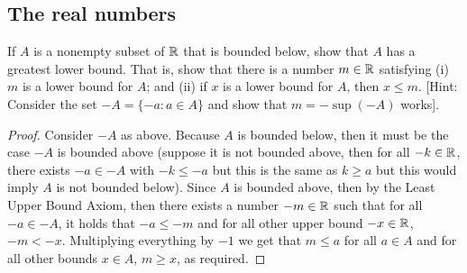 \subsection{The real numbers}

\begin{exercise}{1}
If $A$ is a nonempty subset of $\mathbb{R}$ that is bounded below, show that $A$ has a greatest lower bound. That is, show that there is a number $m\in\mathbb{R}$ satisfying (i) $m$ is a lower bound for $A$; and (ii) if $x$ is a lower bound for $A$, then $x\leq m$. [Hint: Consider the set $-A=\{-a:a\in A\}$ and show that $m=-\sup(-A)$ works].
\end{exercise}
\begin{proof}
Consider $-A$ as above. Because $A$ is bounded below, then it must be the case $-A$ is bounded above (suppose it is not bounded above, then for all $-k\in\mathbb{R}$, there exists $-a\in -A$ with $-k\leq -a$ but this is the same as $k\geq a$ but this would imply $A$ is not bounded below). Since $A$ is bounded above, then by the Least Upper Bound Axiom, then there exists a number $-m\in\mathbb{R}$ such that for all $-a\in -A$, it holds that $-a\leq -m$ and for all other upper bound $-x\in\mathbb{R}$, $-m<-x$. Multiplying everything by $-1$ we get that $m\leq a$ for all $a\in A$ and for all other bounds $x\in A$, $m\geq x$, as required.
\end{proof}

